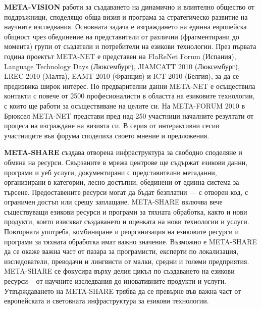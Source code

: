 \documentclass[]{../../metanetpaper}
\begin{document}
\begin{multicols}{2}
\textbf{META-VISION} работи за създаването на динамично и влиятелно
общество от поддръжници, споделящо обща визия и програма за
стратегическо развитие на научните изследвания. Основната задача е
изграждането на единна европейска общност чрез обединение на
представители от различни (фрагментирани до момента) групи от
създатели и потребители на езикови технологии. През първата година
проектът META-NET е представен на FlaReNet Forum (Испания), Language
Technology Days (Люксембург), JIAMCATT 2010 (Люксембург), LREC 2010
(Mалта), EAMT 2010 (Франция) и ICT 2010 (Белгия), за да се предизвика
широк интерес.  По предварителни данни META-NET е осъществила контакти
с повече от 2500 професионалисти в областта на езиковите технологии, с
които ще работи за осъществяване на целите си. На META-FORUM 2010 в
Брюксел META-NET представи пред над 250 участници началните резултати
от процеса на изграждане на визията си. В серия от интерактивни сесии
участниците във форума споделиха своето мнение и предложения.

\textbf{META-SHARE} създава отворена инфраструктура за свободно
споделяне и обмяна на ресурси. Свързаните в мрежа центрове ще съдържат
езикови данни, програми и уеб услуги, документирани с представителни
метаданни, организирани в категории, лесно достъпни, обединени от
единна система за търсене.  Предоставените ресурси могат да бъдат
безплатни — с отворен код, с ограничен достъп или срещу
заплащане. META-SHARE включва вече съществуващи езикови ресурси и
програми за тяхната обработка, както и нови продукти, които изискват
създаването и оценката на нови технологии и услуги.  Повторната
употреба, комбиниране и реорганизация на езиковите ресурси и програми
за тяхната обработка имат важно значение. Възможно е META-SHARE да се
окаже важна част от пазара за програмисти, експерти по локализация,
изследователи, преводачи и лингвисти от малки, средни и големи
предприятия. META-SHARE се фокусира върху делия цикъл по създаването
на езикови ресурси – от научните изследвания до иновативните продукти
и услуги. Утвърждаването на META-SHARE трябва да се превърне във важна
част от европейската и световната инфраструктура за езикови
технологии.


\end{multicols}
\end{document}
